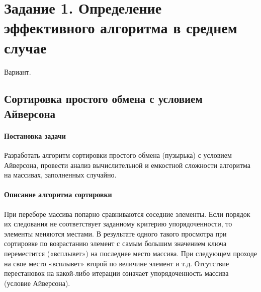 \documentclass[a4paper, 14pt]{extarticle}
\begin{document}

\newpage
\tableofcontents
\newpage
\section{Задание 1. Определение эффективного алгоритма в среднем случае}
 Вариант.
\subsection{Сортировка простого обмена с условием Айверсона}
\paragraph{Постановка задачи}
Разработать алгоритм сортировки простого обмена (пузырька) с условием
Айверсона, провести анализ вычислительной и емкостной сложности алгоритма
на массивах, заполненных случайно.
\paragraph{Описание алгоритма сортировки}
При переборе массива попарно сравниваются соседние элементы. Если
порядок их следования не соответствует заданному критерию
упорядоченности, то элементы меняются местами. В результате одного такого
просмотра при сортировке по возрастанию элемент с самым большим
значением ключа переместится («всплывет») на последнее место массива. При
следующем проходе на свое место «всплывет» второй по величине элемент и
т.д. Отсутствие перестановок на какой-либо итерации означает
упорядоченность массива (условие Айверсона).
\newpage
\end{document}
